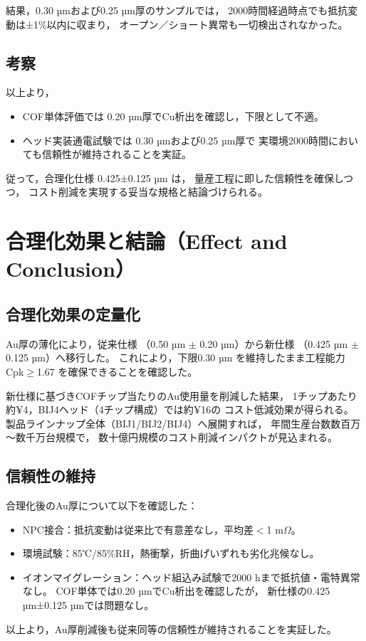 \documentclass[conference]{IEEEtran}
\begin{document}
結果，0.30 µmおよび0.25 µm厚のサンプルでは，
2000時間経過時点でも抵抗変動は±1\%以内に収まり，
オープン／ショート異常も一切検出されなかった。

\subsection{考察}
以上より，
\begin{itemize}
  \item COF単体評価では 0.20 µm厚でCu析出を確認し，下限として不適。  
  \item ヘッド実装通電試験では 0.30 µmおよび0.25 µm厚で
        実環境2000時間においても信頼性が維持されることを実証。  
\end{itemize}

従って，合理化仕様 0.425±0.125 µm は，
量産工程に即した信頼性を確保しつつ，
コスト削減を実現する妥当な規格と結論づけられる。

\section{合理化効果と結論（Effect and Conclusion）}

\subsection{合理化効果の定量化}
Au厚の薄化により，従来仕様
（0.50 µm $\pm$ 0.20 µm）から新仕様
（0.425 µm $\pm$ 0.125 µm）へ移行した。  
これにより，下限0.30 µm を維持したまま工程能力 Cpk$\geq$1.67 を確保できることを確認した。  

新仕様に基づきCOFチップ当たりのAu使用量を削減した結果，
1チップあたり約¥4，BIJ4ヘッド（4チップ構成）では約¥16の
コスト低減効果が得られる。  
製品ラインナップ全体（BIJ1/BIJ2/BIJ4）へ展開すれば，
年間生産台数数百万～数千万台規模で，
数十億円規模のコスト削減インパクトが見込まれる。

\subsection{信頼性の維持}
合理化後のAu厚について以下を確認した：
\begin{itemize}
  \item NPC接合：抵抗変動は従来比で有意差なし，平均差$<$1 m$\Omega$。
  \item 環境試験：85℃/85\%RH，熱衝撃，折曲げいずれも劣化兆候なし。
  \item イオンマイグレーション：ヘッド組込み試験で2000 hまで抵抗値・電特異常なし。  
        COF単体では0.20 µmでCu析出を確認したが，
        新仕様の0.425 µm±0.125 µmでは問題なし。
\end{itemize}
以上より，Au厚削減後も従来同等の信頼性が維持されることを実証した。
\end{document}
